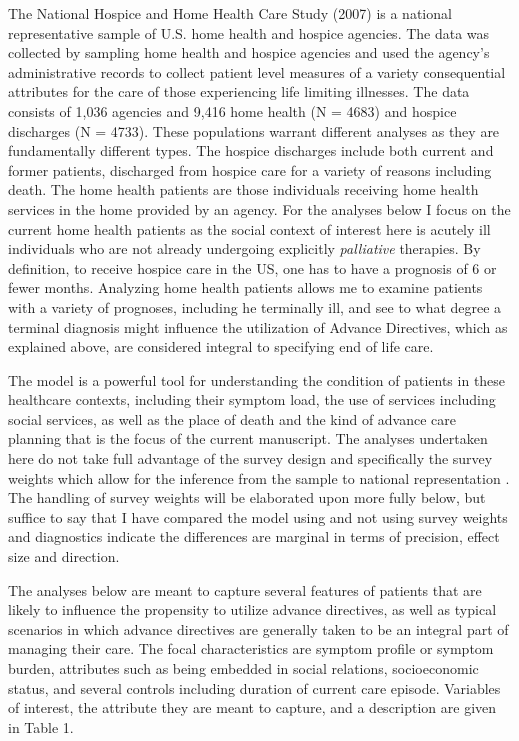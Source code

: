 \documentclass{article}
\begin{document}
The National Hospice and Home Health Care Study (2007) is a national representative sample of U.S. home health and hospice agencies. The data was collected by sampling home health and hospice agencies and used the agency's administrative records to collect patient level measures of a variety consequential attributes for the care of those experiencing life limiting illnesses. The data consists of 1,036 agencies and 9,416 home health (N = 4683) and hospice discharges (N = 4733). These populations warrant different analyses as they are fundamentally different types. The hospice discharges include both current and former patients, discharged from hospice care for a variety of reasons including death. The home health patients are those individuals receiving home health services in the home provided by an agency. For the analyses below I focus on the current home health patients as the social context of interest here is acutely ill individuals who are not already undergoing explicitly \emph{palliative} therapies. By definition, to receive hospice care in the US, one has to have a prognosis of 6 or fewer months. Analyzing home health patients allows me to examine patients with a variety of prognoses, including he terminally ill, and see to what degree a terminal diagnosis might influence the utilization of Advance Directives, which as explained above, are considered integral to specifying end of life care. 

The model is a powerful tool for understanding the condition of patients in these healthcare contexts, including their symptom load, the use of services including social services, as well as the place of death and the kind of advance care planning that is the focus of the current manuscript. The analyses undertaken here do not take full advantage of the survey design and specifically the survey weights which allow for the inference from the sample to national representation \cite{laguna_jeff_racialethnic_2014}. The handling of survey weights will be elaborated upon more fully below, but suffice to say that I have compared the model using and not using survey weights and diagnostics indicate the differences are marginal in terms of precision, effect size and direction. 

The analyses below are meant to capture several features of patients that are likely to influence the propensity to utilize advance directives, as well as typical scenarios in which advance directives are generally taken to be an integral part of managing their care. The focal characteristics are symptom profile or symptom burden, attributes such as being embedded in social relations, socioeconomic status, and several controls including duration of current care episode. Variables of interest, the attribute they are meant to capture, and a description are given in Table 1. 
\end{document}
